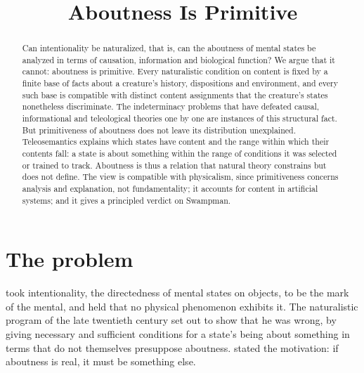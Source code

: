 \documentclass{situationist-preprint}
\title{Aboutness Is Primitive}
\begin{document}
\maketitle

\begin{abstract}
Can intentionality be naturalized, that is, can the aboutness of mental states be analyzed in terms of causation, information and biological function? We argue that it cannot: aboutness is primitive. Every naturalistic condition on content is fixed by a finite base of facts about a creature's history, dispositions and environment, and every such base is compatible with distinct content assignments that the creature's states nonetheless discriminate. The indeterminacy problems that have defeated causal, informational and teleological theories one by one are instances of this structural fact. But primitiveness of aboutness does not leave its distribution unexplained. Teleosemantics explains which states have content and the range within which their contents fall: a state is about something within the range of conditions it was selected or trained to track. Aboutness is thus a relation that natural theory constrains but does not define. The view is compatible with physicalism, since primitiveness concerns analysis and explanation, not fundamentality; it accounts for content in artificial systems; and it gives a principled verdict on Swampman.
\end{abstract}

\section{The problem}

\citet{Brentano1874} took intentionality, the directedness of mental states on objects, to be the mark of the mental, and held that no physical phenomenon exhibits it. The naturalistic program of the late twentieth century set out to show that he was wrong, by giving necessary and sufficient conditions for a state's being about something in terms that do not themselves presuppose aboutness. \citet{Fodor1987} stated the motivation: if aboutness is real, it must be something else.
\end{document}
